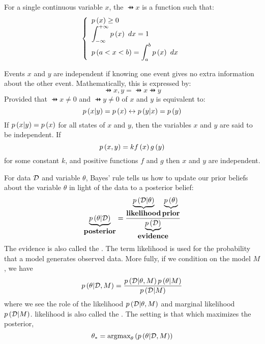 \begin{defi}
For a single continuous variable $x$, the  $\pfun{x}$ is a function such that:
\begin{equation}
\left\{\begin{array}{l}
\pfun{x}\geq0\\
\bint{\pfun{x}}{x}{-\infty}{+\infty}=1\\
\pfun{a<x<b}=\bint{\pfun{x}}{x}{a}{b}
\end{array}\right.
\end{equation}
\cite{Barber2011}
\end{defi}

\begin{defi}[Independence]
Events $x$ and $y$ are independent if knowing one event gives no extra information about the other event. Mathematically, this is expressed by:
\begin{equation}
\pfun{x,y}=\pfun{x}\pfun{y}
\end{equation}
Provided that $\pfun{x}\neq0$ and $\pfun{y}\neq0$  of $x$ and $y$ is equivalent to:
\begin{equation}
\pcond{x}{y}=\pfun{x}\leftrightarrow\pcond{y}{x}=\pfun{y}
\end{equation}
If $\pcond{x}{y}=\pfun{x}$ for all states of $x$ and $y$, then the variables $x$ and $y$ are said to be independent. If
\begin{equation}
\pfun{x,y}=k\ffun{x}\gfun{y}
\end{equation}
for some constant $k$, and positive functions $f$ and $g$ then $x$ and $y$ are independent.
\cite{Barber2011}
\end{defi}

\begin{defi}
For data $\calD$ and variable $\theta$, Bayes' rule tells us how to update our prior beliefs about the variable $\theta$ in light of the data to a posterior belief:
\begin{equation}
\underbrace{\pcond{\theta}{\calD}}_{\mbox{\term{posterior}}}=\displaystyle\frac{\underbrace{\pcond{\calD}{\theta}}_{\mbox{\term{likelihood}}}\underbrace{\pfun{\theta}}_{\mbox{\term{prior}}}}{\underbrace{\pfun{\calD}}_{\mbox{\term{evidence}}}}
\end{equation}
The evidence is also called the . The term likelihood is used for the probability that a model generates observed data. More fully, if we condition on the model $M$, we have
\begin{equation}
\pcond{\theta}{\calD,M}=\displaystyle\frac{\pcond{\calD}{\theta,M}\pcond{\theta}{M}}{\pcond{\calD}{M}}
\end{equation}
where we see the role of the likelihood $\pcond{\calD}{\theta,M}$ and marginal likelihood $\pcond{\calD}{M}$. likelihood is also called the . The  setting is that which maximizes the posterior,
\begin{equation}
\theta_*=\argmax[\theta]{\pcond{\theta}{\calD,M}}
\end{equation}
\cite{Barber2011}
\end{defi}

